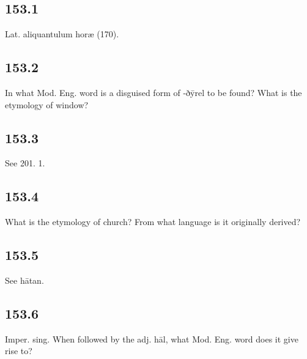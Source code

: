 \subsection*{153.1}

Lat. aliquantulum horæ (170).

\subsection*{153.2}

In what Mod. Eng. word is a disguised form of -ðȳrel to be found? What is the etymology of window?

\subsection*{153.3}

See 201. 1.

\subsection*{153.4}

What is the etymology of church? From what language is it originally derived?

\subsection*{153.5}

See hātan.

\subsection*{153.6}

Imper. sing. When followed by the adj. hāl, what Mod. Eng. word does it give rise to?

